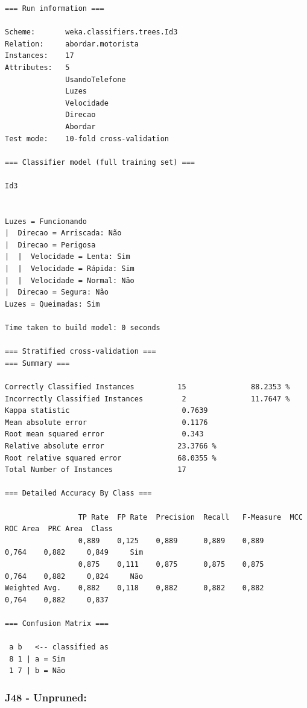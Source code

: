 \documentclass[
    article,            %
    11pt,               %
    oneside,            %
    a4paper,            %
    english,            %
    brazil,             %
    sumario=tradicional,
    ]{abntex2}
\begin{document}
\begin{Verbatim}[frame=single, fontsize=\tiny]
=== Run information ===

Scheme:       weka.classifiers.trees.Id3 
Relation:     abordar.motorista
Instances:    17
Attributes:   5
              UsandoTelefone
              Luzes
              Velocidade
              Direcao
              Abordar
Test mode:    10-fold cross-validation

=== Classifier model (full training set) ===

Id3


Luzes = Funcionando
|  Direcao = Arriscada: Não
|  Direcao = Perigosa
|  |  Velocidade = Lenta: Sim
|  |  Velocidade = Rápida: Sim
|  |  Velocidade = Normal: Não
|  Direcao = Segura: Não
Luzes = Queimadas: Sim

Time taken to build model: 0 seconds

=== Stratified cross-validation ===
=== Summary ===

Correctly Classified Instances          15               88.2353 %
Incorrectly Classified Instances         2               11.7647 %
Kappa statistic                          0.7639
Mean absolute error                      0.1176
Root mean squared error                  0.343 
Relative absolute error                 23.3766 %
Root relative squared error             68.0355 %
Total Number of Instances               17     

=== Detailed Accuracy By Class ===

                 TP Rate  FP Rate  Precision  Recall   F-Measure  MCC      ROC Area  PRC Area  Class
                 0,889    0,125    0,889      0,889    0,889      0,764    0,882     0,849     Sim
                 0,875    0,111    0,875      0,875    0,875      0,764    0,882     0,824     Não
Weighted Avg.    0,882    0,118    0,882      0,882    0,882      0,764    0,882     0,837     

=== Confusion Matrix ===

 a b   <-- classified as
 8 1 | a = Sim
 1 7 | b = Não
\end{Verbatim}


\subsubsection*{\textbf{J48 - Unpruned:}}
\end{document}
